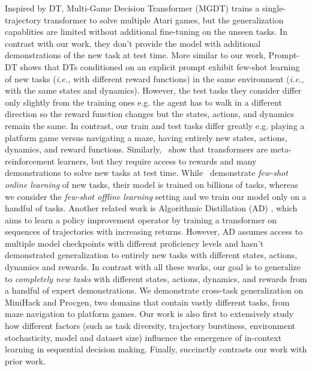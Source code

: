 \documentclass[]{fairmeta}
\newcommand{\ie}{\textit{i.e.,}}
\begin{document}
Inspired by DT, Multi-Game Decision Transformer (MGDT) \cite{MGDT} trains a single-trajectory transformer to solve multiple Atari games, but the generalization capablities are limited without additional fine-tuning on the unseen tasks. In contrast with our work, they don't provide the model with additional demonstrations of the new task at test time.
More similar to our work, Prompt-DT \cite{prompt_dt} shows that DTs conditioned on an explicit prompt exhibit few-shot learning of new tasks (\ie{} with different reward functions) in the same environment (\ie{} with the same states and dynamics). However, the test tasks they consider differ only slightly from the training ones e.g. the agent has to walk in a different direction so the reward function changes but the states, actions, and dynamics remain the same. In contrast, our train and test tasks differ greatly e.g. playing a platform game versus navigating a maze, having entirely new states, actions, dynamics, and reward functions. Similarly,~\cite{melo2022transformers} show that transformers are meta-reinforcement learners, but they require access to rewards and many demonstrations to solve new tasks at test time. While~\cite{team2023humantimescale} demonstrate \textit{few-shot online learning} of new tasks, their model is trained on billions of tasks, whereas we consider the \textit{few-shot offline learning} setting and we train our model only on a handful of tasks. Another related work is Algorithmic Distillation (AD) \cite{algo_dist}, which aims to learn a policy improvement operator by training a transformer on sequences of trajectories with increasing returns. However, AD assumes access to multiple model checkpoints with different proficiency levels and hasn't demonstrated generalization to entirely new tasks with different states, actions, dynamics and rewards. In contrast with all these works, our goal is to generalize to \textit{completely new tasks} with different states, actions, dynamics, and rewards from a handful of expert demonstrations. We demonstrate cross-task generalization on MiniHack and Procgen, two domains that contain vastly different tasks, from maze navigation to platform games. Our work is also first to extensively study how different factors (such as task diversity, trajectory burstiness, environment stochasticity, model and dataset size) influence the emergence of in-context learning in sequential decision making.
Finally,  succinctly contrasts our work with prior work.
\end{document}
